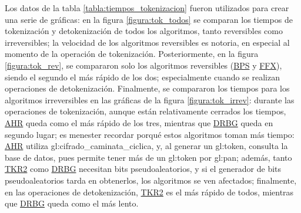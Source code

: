 Los datos de la tabla \ref{tabla:tiempos_tokenizacion} fueron utilizados para
crear una serie de gráficas: en la figura \ref{figura:tok_todos} se comparan los
tiempos de tokenización y detokenización de todos los algoritmos, tanto
reversibles como irreversibles; la velocidad de los algoritmos reversibles es
notoria, en especial al momento de la operación de tokenización. Posteriormente,
en la figura \ref{figura:tok_rev}, se compararon solo los algoritmos reversibles
(\hyperref[sec:bps]{BPS} y \hyperref[sec:ffx]{FFX}), siendo el segundo el más
rápido de los dos; especialmente cuando se realizan operaciones de
detokenización. Finalmente, se compararon los tiempos para los algoritmos
irreversibles en las gráficas de la figura \ref{figura:tok_irrev}: durante las
operaciones de tokenización, aunque están relativamente cerrados los tiempos,
\hyperref[sec:ahr]{AHR} queda como el más rápido de los tres, mientras que
\hyperref[sec:drbg_lista]{DRBG} queda en segundo lugar; es menester recordar
porqué estos algoritmos toman más tiempo: \hyperref[sec:ahr]{AHR} utiliza
\gls{gl:cifrado_caminata_ciclica}, y, al generar un \gls{gl:token}, consulta la
base de datos, pues permite tener más de un \gls{gl:token} por \gls{gl:pan};
además, tanto \hyperref[sec:tkr]{TKR2} como \hyperref[sec:drbg_lista]{DRBG}
necesitan bits pseudoaleatorios, y si el generador de bits pseudoaleatorios
tarda en obtenerlos, los algoritmos se ven afectados; finalmente, en las
operaciones de detokenización, \hyperref[sec:tkr]{TKR2} es el más rápido de
todos, mientras que \hyperref[sec:drbg_lista]{DRBG} queda como el más lento.

